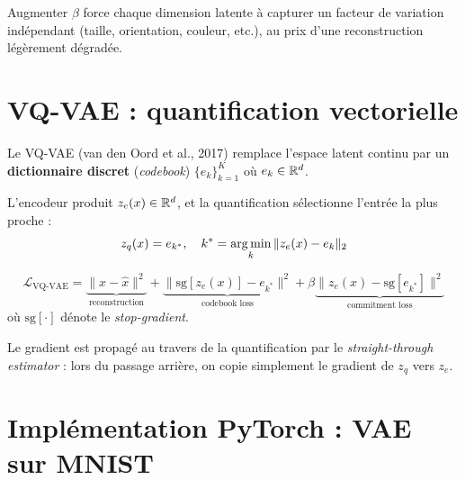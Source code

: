 \begin{intuition}
Augmenter $\beta$ force chaque dimension latente \`a capturer un facteur de variation ind\'ependant (taille, orientation, couleur, etc.), au prix d'une reconstruction l\'eg\`erement d\'egrad\'ee.
\end{intuition}

\section{VQ-VAE : quantification vectorielle}
\label{sec:vq-vae}

\begin{definition}
Le VQ-VAE (van den Oord et al., 2017) remplace l'espace latent continu par un \textbf{dictionnaire discret} (\emph{codebook}) $\{e_k\}_{k=1}^K$ o\`u $e_k \in \mathbb{R}^d$.

L'encodeur produit $z_e(x) \in \mathbb{R}^d$, et la quantification s\'electionne l'entr\'ee la plus proche :
\begin{equation}
z_q(x) = e_{k^*}, \quad k^* = \operatorname*{arg\,min}_k \|z_e(x) - e_k\|_2
\label{eq:vq}
\end{equation}
\end{definition}

\begin{formules}[title=\textbf{Perte VQ-VAE}]
\begin{equation}
\mathcal{L}_{\text{VQ-VAE}} = \underbrace{\|x - \hat{x}\|^2}_{\text{reconstruction}} + \underbrace{\|\text{sg}[z_e(x)] - e_{k^*}\|^2}_{\text{codebook loss}} + \beta \underbrace{\|z_e(x) - \text{sg}[e_{k^*}]\|^2}_{\text{commitment loss}}
\label{eq:vq-vae-loss}
\end{equation}
o\`u $\text{sg}[\cdot]$ d\'enote le \emph{stop-gradient}.
\end{formules}

\begin{remarque}
Le gradient est propag\'e au travers de la quantification par le \emph{straight-through estimator} : lors du passage arri\`ere, on copie simplement le gradient de $z_q$ vers $z_e$.
\end{remarque}

\section{Impl\'ementation PyTorch : VAE sur MNIST}
\label{sec:vae-pytorch}

